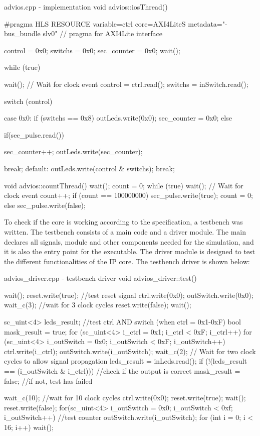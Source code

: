 \documentclass[../main.tex]{subfiles}
\begin{document}
\begin{myminted}{advios.cpp - implementation}
    void advios::iosThread() {
    #pragma HLS RESOURCE variable=ctrl core=AXI4LiteS metadata="-bus_bundle slv0" // pragma for AXI4Lite interface
    
        control = 0x0;
        switchs = 0x0;
        sec_counter = 0x0;
        wait();
    
        while (true) {
            wait(); // Wait for clock event
            control = ctrl.read();
            switchs = inSwitch.read();
    
            switch (control){
                case 0x0:
                    if (switchs == 0x8) {
                        outLeds.write(0x0);
                        sec_counter = 0x0;
                    }else{
                        if(sec_pulse.read()){
        
                            sec_counter++;
                            outLeds.write(sec_counter);
                        }
                    }
                    break;
                default:
                    outLeds.write(control & switchs);
                    break;
            }
        }
    }
    void advios::countThread() {
        wait();
        count = 0;
        while (true) {
            wait();  // Wait for clock event
            count++;
            if (count == 100000000) {
                sec_pulse.write(true);
                count = 0;
            } else {
                sec_pulse.write(false);
            }
        }
    }
\end{myminted}
\newpage
To check if the core is working according to the specification, a testbench was written. The testbench consists of a main code
and a driver module. 
The main declares all signals, module and other components needed for the simulation, and it is also the entry point for the executable. The driver module is designed to test
the different functionalities of the IP core. The testbench driver is shown below:
\begin{myminted}{advios_driver.cpp - testbench driver}
void advios_driver::test(){
	wait();
	reset.write(true); //test reset signal
	ctrl.write(0x0);
	outSwitch.write(0x0);
	wait_c(3); //wait for 3 clock cycles
	reset.write(false);
	wait();

	sc_uint<4> leds_result; //test ctrl AND switch (when ctrl = 0x1-0xF)
	bool mask_result = true;
	for (sc_uint<4> i_ctrl = 0x1; i_ctrl < 0xF; i_ctrl++) {
	    for (sc_uint<4> i_outSwitch = 0x0; i_outSwitch < 0xF; i_outSwitch++) {
	        ctrl.write(i_ctrl);
	        outSwitch.write(i_outSwitch);
	        wait_c(2);  // Wait for two clock cycles to allow signal propagation
	        leds_result = inLeds.read();
	        if (!(leds_result == (i_outSwitch & i_ctrl))) { //check if the output is correct
	            mask_result = false; //if not, test has failed
	        }
	    }
	}

	wait_c(10); //wait for 10 clock cycles
	ctrl.write(0x0);
	reset.write(true);
	wait();
	reset.write(false);
	for(sc_uint<4> i_outSwitch = 0x0; i_outSwitch < 0xf; i_outSwitch++){ //test counter
		outSwitch.write(i_outSwitch);
		for (int i = 0; i < 16; i++){
			wait();
		}
	}
}
\end{myminted}
\end{document}

